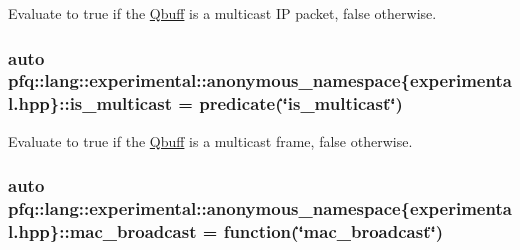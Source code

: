 Evaluate to {\ttfamily true} if the \hyperlink{structpfq_1_1lang_1_1Qbuff}{Qbuff} is a multicast IP packet, {\ttfamily false} otherwise. 

\subsubsection[{\texorpdfstring{is\+\_\+multicast}{is_multicast}}]{\setlength{\rightskip}{0pt plus 5cm}auto pfq\+::lang\+::experimental\+::anonymous\+\_\+namespace\{experimental.\+hpp\}\+::is\+\_\+multicast = {\bf predicate}(\char`\"{}is\+\_\+multicast\char`\"{})}\hypertarget{namespacepfq_1_1lang_1_1experimental_1_1anonymous__namespace_02experimental_8hpp_03_aaec1b91653bd79cedff8912605c7cdf8}{}\label{namespacepfq_1_1lang_1_1experimental_1_1anonymous__namespace_02experimental_8hpp_03_aaec1b91653bd79cedff8912605c7cdf8}


Evaluate to {\ttfamily true} if the \hyperlink{structpfq_1_1lang_1_1Qbuff}{Qbuff} is a multicast frame, {\ttfamily false} otherwise. 

\subsubsection[{\texorpdfstring{mac\+\_\+broadcast}{mac_broadcast}}]{\setlength{\rightskip}{0pt plus 5cm}auto pfq\+::lang\+::experimental\+::anonymous\+\_\+namespace\{experimental.\+hpp\}\+::mac\+\_\+broadcast = {\bf function}(\char`\"{}mac\+\_\+broadcast\char`\"{})}\hypertarget{namespacepfq_1_1lang_1_1experimental_1_1anonymous__namespace_02experimental_8hpp_03_aa889cbcf0c306d992508759fc5e677cd}{}\label{namespacepfq_1_1lang_1_1experimental_1_1anonymous__namespace_02experimental_8hpp_03_aa889cbcf0c306d992508759fc5e677cd}


